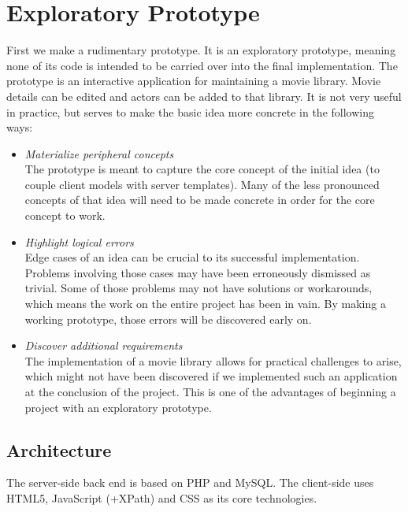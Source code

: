 \documentclass[thesis.tex]{subfiles}
\begin{document}
\chapter{Exploratory Prototype}
\label{chap:prototype}
First we make a rudimentary prototype. It is an exploratory prototype,
meaning none of its code is intended to be carried over into the final
implementation.
The prototype is an interactive application for maintaining a movie
library. Movie details can be edited and actors can be added to that library.
It is not very useful in practice, but serves to make the basic idea more
concrete in the following ways:

\begin{itemize}
	\label{list:prototype-motivation}
	\item \emph{Materialize peripheral concepts}\\
	The prototype is meant to capture the core concept of the initial idea
	(to couple client models with server templates).
	Many of the less pronounced concepts of that idea will need to be made
	concrete in order for the core concept to work.
	\item \emph{Highlight logical errors}\\
	Edge cases of an idea can be crucial to its successful implementation.
	Problems involving those cases may have been erroneously dismissed as trivial.
	Some of those problems may not have solutions or workarounds, which
	means the work on the entire project has been in vain. By making a working
	prototype, those errors will be discovered early on.
	\item \emph{Discover additional requirements}\\
	The implementation of a movie library allows for practical challenges to
	arise, which might not have been discovered if we implemented such an
	application at the conclusion of the project. This is one of the advantages
	of beginning a project with an exploratory prototype.
\end{itemize}

\section{Architecture}

The server-side back end is based on PHP and MySQL. The client-side uses
HTML5, JavaScript (+XPath) and CSS as its core technologies.
\end{document}
